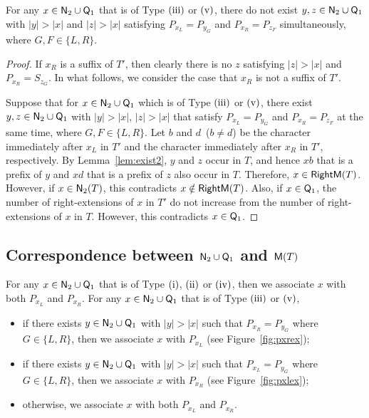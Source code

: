   \begin{lemma} \label{lem:sp35}
    For any $x \in \mathsf{N}_{\mathrm{2}} \cup \mathsf{Q}_{\mathrm{1}}$ that is of Type $\rm{(iii)}$ or $\rm{(v)}$, 
    there do not exist $y,z \in \mathsf{N}_{\mathrm{2}} \cup \mathsf{Q}_{\mathrm{1}}$ with
    $|y|>|x|$ and $|z|>|x|$
    satisfying $P_{x_L}=P_{{y}_{G}}$ and $P_{x_R}=P_{{z}_{F}}$ simultaneously,
    where $G,F \in \{L,R\}$.
  \end{lemma}

  \begin{proof}
    If $x_R$ is a suffix of $T'$, then clearly there is no $z$ satisfying
    $|z|>|x|$ and $P_{x_R}=S_{{z}_{G}}$.
    In what follows, we consider the case that $x_R$ is not a suffix of $T'$.
    
    Suppose that for $x \in \mathsf{N}_{\mathrm{2}} \cup \mathsf{Q}_{\mathrm{1}}$ which is of Type $\rm{(iii)}$ or $\rm{(v)}$, 
    there exist $y,z \in \mathsf{N}_{\mathrm{2}} \cup \mathsf{Q}_{\mathrm{1}}$ with $|y|>|x|$, $|z|>|x|$
    that satisfy $P_{x_L}=P_{{y}_{G}}$ and $P_{x_R}=P_{{z}_{F}}$ at the same time,
    where $G,F \in \{L,R\}$.
    Let $b$ and $d$~($b \neq d$) be the character immediately after $x_L$ in $T'$ and the character immediately after $x_R$ in $T'$, respectively.
    By Lemma~\ref{lem:exist2}, $y$ and $z$ occur in $T$, and hence $xb$ that is a prefix of $y$ and $xd$ that is a prefix of $z$ also occur in $T$.
    Therefore, $x \in \mathsf{RightM}(T)$. However, if $x \in \mathsf{N}_{\mathrm{2}}(T)$, this contradicts $x \notin \mathsf{RightM}(T)$.
    Also, if $x \in \mathsf{Q}_{\mathrm{1}}$, the number of right-extensions of $x$ in $T'$ do not increase from the number of right-extensions of $x$ in $T$. However, this contradicts $x \in \mathsf{Q}_{\mathrm{1}}$.
  \end{proof}

  \subsection{Correspondence between $\mathsf{N}_{\mathrm{2}} \cup \mathsf{Q}_{\mathrm{1}}$ and $\mathsf{M}(T)$}

  For any $x \in \mathsf{N}_{\mathrm{2}} \cup \mathsf{Q}_{\mathrm{1}}$ that is of Type $\rm{(i)}$, $\rm{(ii)}$ or $\rm{(iv)}$, then we associate $x$ with both $P_{x_L}$ and $P_{x_R}$.
  For any $x \in \mathsf{N}_{\mathrm{2}} \cup \mathsf{Q}_{\mathrm{1}}$ that is of Type $\rm{(iii)}$ or $\rm{(v)}$, 
  \begin{itemize}
    \item if there exists $y\in \mathsf{N}_{\mathrm{2}} \cup \mathsf{Q}_{\mathrm{1}}$ with $|y|>|x|$
  such that $P_{x_R}=P_{{y}_{G}}$ where $G \in \{L,R\}$, then we associate $x$ with $P_{x_L}$ (see Figure~\ref{fig:pxrex});
    \item if there exists $y\in \mathsf{N}_{\mathrm{2}} \cup \mathsf{Q}_{\mathrm{1}}$ with $|y|>|x|$ such that $P_{x_L}=P_{{y}_{G}}$ where $G \in \{L,R\}$, then we associate $x$ with $P_{x_R}$ (see Figure~\ref{fig:pxlex});
    \item otherwise, we associate $x$ with both $P_{x_L}$ and $P_{x_R}$.
  \end{itemize}


